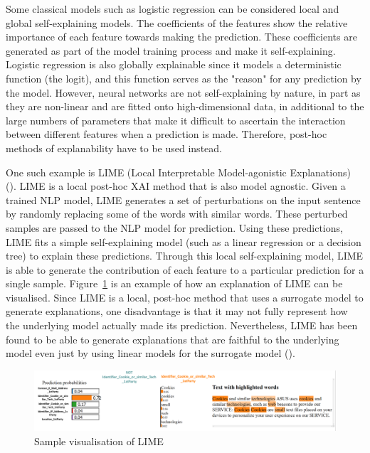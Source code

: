 Some classical models such as logistic regression can be considered local and global self-explaining models. The coefficients of the features show the relative importance of each feature towards making the prediction. These coefficients are generated as part of the model training process and make it self-explaining. Logistic regression is also globally explainable since it models a deterministic function (the logit), and this function serves as the "reason" for any prediction by the model. However, neural networks are not self-explaining by nature, in part as they are non-linear and are fitted onto high-dimensional data, in additional to the large numbers of parameters that make it difficult to ascertain the interaction between different features when a prediction is made. Therefore, post-hoc methods of explanability have to be used instead. 

One such example is LIME (Local Interpretable Model-agonistic Explanations) (\cite{lime}). LIME is a local post-hoc XAI method that is also model agnostic. Given a trained NLP model, LIME generates a set of perturbations on the input sentence by randomly replacing some of the words with similar words. These perturbed samples are passed to the NLP model for prediction. Using these predictions, LIME fits a simple self-explaining model (such as a linear regression or a decision tree) to explain these predictions. Through this local self-explaining model, LIME is able to generate the contribution of each feature to a particular prediction for a single sample. Figure~\ref{fig:lime_sample} is an example of how an explanation of LIME can be visualised. Since LIME is a local, post-hoc method that uses a surrogate model to generate explanations, one disadvantage is that it may not fully represent how the underlying model actually made its prediction. Nevertheless, LIME has been found to be able to generate explanations that are faithful to the underlying model even just by using linear models for the surrogate model (\cite{lime}).

\begin{figure}[!ht]
	\centering
	\includegraphics[width=1\linewidth]{figures/explanations_visualisations/section_4a/Picture1.png}
	\caption{Sample visualisation of LIME}   
    \label{fig:lime_sample}
\end{figure}

